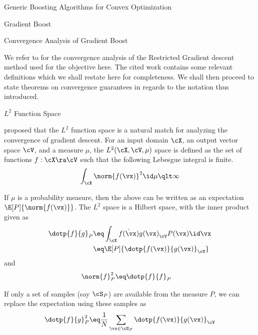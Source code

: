 \documentclass{article}
\begin{document}
\begin{psection}{Generic Boosting Algorithms for Convex Optimization}
\begin{algo}[0.8\textwidth]{Gradient Boost}
	\end{algo}

	\begin{psubsection}{Convergence Analysis of Gradient Boost}

		We refer to \cite{cvx-boosting} for the convergence analysis of the Restricted Gradient descent method used for the objective here. The cited work contains some relevant definitions which we shall restate here for completeness. We shall then proceed to state theorems on convergence guarantees in regards to the notation thus introduced.

		\begin{pssubsection}{$L^2$ Function Space}

			\cite{functionspace} proposed that the $L^2$ function space is a natural match for analyzing the convergence of gradient descent. For an input domain $\cX$, an output vector space $\cV$, and a measure $\mu$, the $L^2(\cX, \cV, \mu)$ space is defined as the set of functions $f : \cX \ra \cV$ such that the following Lebesgue integral is finite.
			\begin{align*}
				\int_{\cX} \norm{f(\vx)}^{2} \id \mu \qlt \infty
			\end{align*}

			If $\mu$ is a probability measure, then the above can be written as an expectation $\E[P]{\norm{f(\vx)}}$. The $L^2$ space is a Hilbert space, with the inner product given as
			\begin{align*}
				\dotp{f}{g}_P &\eq	\int_{\cX} \dot{f(\vx)}{g(\vx)}_{\cV} P(\vx) \id \vx \\
				&\eq				\E[P]{\dotp{f(\vx)}{g(\vx)}_{\cV}}
			\end{align*}
			and
			\begin{align*}
				\norm{f}_P^2 &\eq \dotp{f}{f}_P
			\end{align*}

			If only a set of samples (say $\cS_P$) are available from the measure $P$, we can replace the expectation using these samples as
			\begin{align*}
				\dotp{f}{g}_P^2 \eq \frac{1}{N} \sum_{\vx \in \cS_P} \dotp{f(\vx)}{g(\vx)}_{\cV}
			\end{align*}

		\end{pssubsection}


\end{psubsection}
\end{psection}
\end{document}
